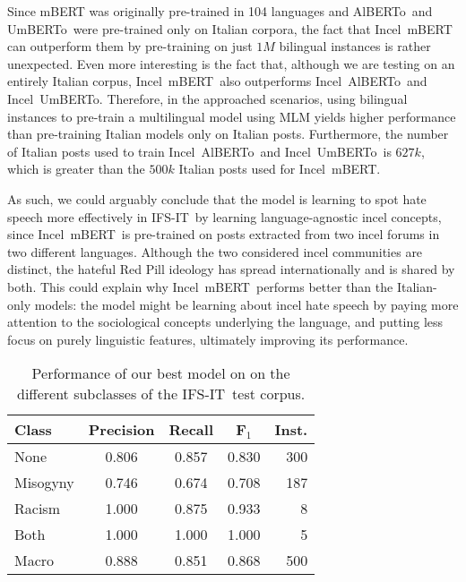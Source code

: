 \documentclass[
twocolumn,
]{ceurart}
\newcommand{\dsITclassification}{IFS-IT}
\newcommand{\imbert}{\mbox{Incel mBERT}}
\newcommand{\umbert}{\mbox{UmBERTo}}
\newcommand{\albert}{\mbox{AlBERTo}}
\newcommand{\iumbert}{\mbox{Incel UmBERTo}}
\newcommand{\ialbert}{\mbox{Incel AlBERTo}}
\begin{document}
Since mBERT was originally pre-trained in 104 languages and \albert\, and \umbert\, were pre-trained only on Italian corpora, the fact that \imbert\, can outperform them by pre-training on just $1M$ bilingual instances is rather unexpected.
Even more interesting is the fact that, although we are testing on an entirely Italian corpus, \imbert\, also outperforms \ialbert\, and \iumbert. Therefore, in the approached scenarios, using bilingual instances to pre-train a multilingual model using MLM yields higher performance than pre-training Italian models only on Italian posts. Furthermore, the number of Italian posts used to train \ialbert\, and \iumbert\, is $627k$, which is greater than the $500k$ Italian posts used for \imbert.

As such, we could arguably conclude that the model is learning to spot hate speech more effectively in \dsITclassification\, by learning language-agnostic incel concepts, since \imbert\, is pre-trained on posts extracted from two incel forums in two different languages.
Although the two considered incel communities are distinct, the hateful Red Pill ideology has spread internationally and is shared by both. This could explain why \imbert\, performs better than the Italian-only models: the model might be learning about incel hate speech by paying more attention to the sociological concepts underlying the language, and putting less focus on purely linguistic features, ultimately improving its performance.

\begin{table}
    \centering
    \caption{Performance of our best model on on the different subclasses of the \dsITclassification\, test corpus.
    }
    \label{tab:misogyny-racism-subsets-statistics}
  \begin{tabular}{lcccr}
    \hline
    \bf Class & \bf Precision & \bf Recall & \bf F$_1$ & \bf Inst. \\
    \hline
    None & 0.806 & 0.857 & 0.830 & 300 \\
    Misogyny & 0.746 & 0.674 & 0.708 & 187 \\
    Racism & 1.000 & 0.875 & 0.933 & 8 \\
    Both & 1.000 & 1.000 & 1.000 & 5 \\
    \hline
    Macro & 0.888 & 0.851 & 0.868 & 500 \\
    \hline
    \end{tabular}

\end{table}
\end{document}
